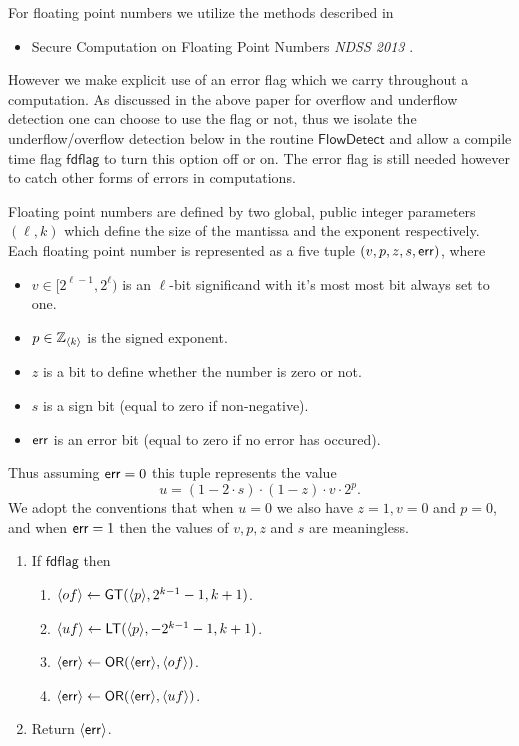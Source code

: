 
For floating point numbers we utilize the methods described in
\begin{itemize}
\item Secure Computation on Floating Point Numbers {\em NDSS 2013} \cite{ABZS13}.
\end{itemize}
However we make explicit use of an error flag which we carry throughout
a computation.
As discussed in the above paper for overflow and underflow detection
one can choose to use the flag or not, thus we isolate the underflow/overflow
detection below in the routine $\mathsf{FlowDetect}$ and allow a compile
time flag $\mathsf{fdflag}$ to turn this option off or on.
The error flag is still needed however to catch other forms of errors
in computations.

Floating point numbers are defined by two global, public integer parameters
$(\ell,k)$ which define the size of the mantissa and the exponent respectively.
Each floating point number is represented as a five tuple $(v,p,z,s,\mathsf{err})$, where
\begin{itemize}
\item $v \in [2^{\ell-1},2^\ell)$ is an $\ell$-bit significand with it's most
most bit always set to one.
\item $p \in {\mathbb{Z}}_{\langle k \rangle}$ is the signed exponent.
\item $z$ is a bit to define whether the number is zero or not.
\item $s$ is a sign bit (equal to zero if non-negative).
\item $\mathsf{err}$ is an error bit (equal to zero if no error has occured).
\end{itemize}
Thus assuming $\mathsf{err}=0$ this tuple represents the value
\[ u=(1- 2 \cdot s) \cdot (1-z) \cdot v \cdot 2^p. \]
We adopt the conventions that when $u=0$ we also have $z=1, v=0$ and $p=0$,
and when $\mathsf{err}=1$ then the values of $v,p,z$ and $s$ are meaningless.

\begin{enumerate}
\item If $\mathsf{fdflag}$ then
\begin{enumerate}
\item $\langle of \rangle \leftarrow \mathsf{GT}(\langle p \rangle,2^{k-1}-1,k+1)$.
\item $\langle uf \rangle \leftarrow \mathsf{LT}(\langle p \rangle,-2^{k-1}-1,k+1)$.
\item $\langle \mathsf{err} \rangle \leftarrow \mathsf{OR}(\langle \mathsf{err} \rangle,\langle of \rangle)$.
\item $\langle \mathsf{err} \rangle \leftarrow \mathsf{OR}(\langle \mathsf{err} \rangle,\langle uf \rangle)$.
\end{enumerate}
\item Return $\langle \mathsf{err} \rangle$.
\end{enumerate}

